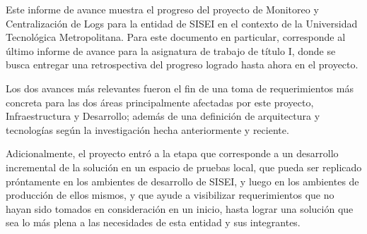 \documentclass[
	spanish, %
	letterpaper, oneside
]{article}
\begin{document}
\templatePortrait

\templatePagecfg

\begin{abstractd}

	Este informe de avance muestra el progreso del proyecto de Monitoreo y Centralización de Logs para la entidad de SISEI en el contexto de la Universidad Tecnológica Metropolitana. Para este documento en particular, corresponde al último informe de avance para la asignatura de trabajo de título I, donde se busca entregar una retrospectiva del progreso logrado hasta ahora en el proyecto.

	Los dos avances más relevantes fueron el fin de una toma de requerimientos más concreta para las dos áreas principalmente afectadas por este proyecto, Infraestructura y Desarrollo; además de una definición de arquitectura y tecnologías según la investigación hecha anteriormente y reciente.

	Adicionalmente, el proyecto entró a la etapa que corresponde a un desarrollo incremental de la solución en un espacio de pruebas local, que pueda ser replicado próntamente en los ambientes de desarrollo de SISEI, y luego en los ambientes de producción de ellos mismos, y que ayude a visibilizar requerimientos que no hayan sido tomados en consideración en un inicio, hasta lograr una solución que sea lo más plena a las necesidades de esta entidad y sus integrantes.

\end{abstractd}

\templateIndex

\templateFinalcfg












\nocite{alberdi_2020}
\nocite{sharif_2022}
\nocite{schwaber2020scrum}
\nocite{Anonymous}



\end{document}
